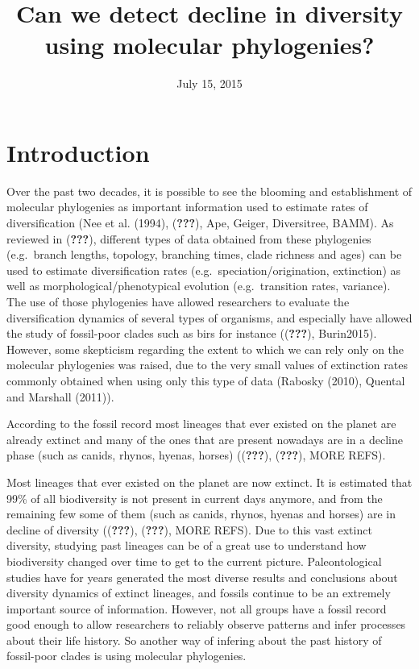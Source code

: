 \documentclass[11pt,]{article}
\title{Can we detect decline in diversity using molecular phylogenies?}
\author{}
\date{July 15, 2015}
\begin{document}
\maketitle

\section{Introduction}\label{introduction}

Over the past two decades, it is possible to see the blooming and
establishment of molecular phylogenies as important information used to
estimate rates of diversification (Nee et al. (1994), ({\textbf{???}}),
Ape, Geiger, Diversitree, BAMM). As reviewed in ({\textbf{???}}),
different types of data obtained from these phylogenies (e.g.~branch
lengths, topology, branching times, clade richness and ages) can be used
to estimate diversification rates (e.g.~speciation/origination,
extinction) as well as morphological/phenotypical evolution
(e.g.~transition rates, variance). The use of those phylogenies have
allowed researchers to evaluate the diversification dynamics of several
types of organisms, and especially have allowed the study of fossil-poor
clades such as birs for instance (({\textbf{???}}), Burin2015). However,
some skepticism regarding the extent to which we can rely only on the
molecular phylogenies was raised, due to the very small values of
extinction rates commonly obtained when using only this type of data
(Rabosky (2010), Quental and Marshall (2011)).

According to the fossil record most lineages that ever existed on the
planet are already extinct and many of the ones that are present
nowadays are in a decline phase (such as canids, rhynos, hyenas, horses)
(({\textbf{???}}), ({\textbf{???}}), MORE REFS).

Most lineages that ever existed on the planet are now extinct. It is
estimated that 99\% of all biodiversity is not present in current days
anymore, and from the remaining few some of them (such as canids,
rhynos, hyenas and horses) are in decline of diversity
(({\textbf{???}}), ({\textbf{???}}), MORE REFS). Due to this vast
extinct diversity, studying past lineages can be of a great use to
understand how biodiversity changed over time to get to the current
picture. Paleontological studies have for years generated the most
diverse results and conclusions about diversity dynamics of extinct
lineages, and fossils continue to be an extremely important source of
information. However, not all groups have a fossil record good enough to
allow researchers to reliably observe patterns and infer processes about
their life history. So another way of infering about the past history of
fossil-poor clades is using molecular phylogenies.
\end{document}
